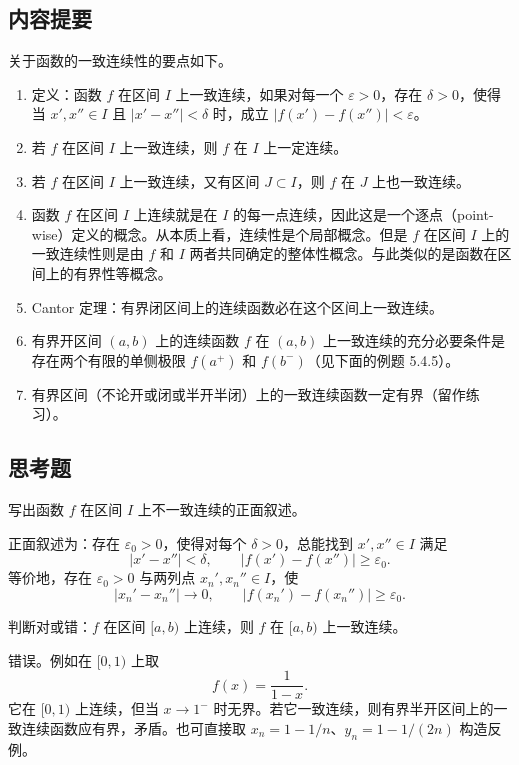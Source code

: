 \subsection{内容提要}

关于函数的一致连续性的要点如下。

\begin{enumerate}
  \item 定义：函数 $f$ 在区间 $I$ 上一致连续，如果对每一个 $\varepsilon>0$，存在 $\delta>0$，使得当 $x',x''\in I$ 且 $|x'-x''|<\delta$ 时，成立 $|f(x')-f(x'')|<\varepsilon$。
  \item 若 $f$ 在区间 $I$ 上一致连续，则 $f$ 在 $I$ 上一定连续。
  \item 若 $f$ 在区间 $I$ 上一致连续，又有区间 $J\subset I$，则 $f$ 在 $J$ 上也一致连续。
  \item 函数 $f$ 在区间 $I$ 上连续就是在 $I$ 的每一点连续，因此这是一个逐点（point-wise）定义的概念。从本质上看，连续性是个局部概念。但是 $f$ 在区间 $I$ 上的一致连续性则是由 $f$ 和 $I$ 两者共同确定的整体性概念。与此类似的是函数在区间上的有界性等概念。
  \item Cantor 定理：有界闭区间上的连续函数必在这个区间上一致连续。
  \item 有界开区间 $(a,b)$ 上的连续函数 $f$ 在 $(a,b)$ 上一致连续的充分必要条件是存在两个有限的单侧极限 $f(a^+)$ 和 $f(b^-)$（见下面的例题 5.4.5）。
  \item 有界区间（不论开或闭或半开半闭）上的一致连续函数一定有界（留作练习）。
\end{enumerate}

\subsection{思考题}

\begin{xthought}[1]
写出函数 $f$ 在区间 $I$ 上不一致连续的正面叙述。
\end{xthought}
\begin{xsolution}
正面叙述为：存在 $\varepsilon_0>0$，使得对每个 $\delta>0$，总能找到 $x',x''\in I$ 满足
\[
 |x'-x''|<\delta,
 \qquad
 |f(x')-f(x'')|\ge\varepsilon_0.
\]
等价地，存在 $\varepsilon_0>0$ 与两列点 $x_n',x_n''\in I$，使
\[
 |x_n'-x_n''|\to0,
 \qquad
 |f(x_n')-f(x_n'')|\ge\varepsilon_0.
\]
\end{xsolution}


\begin{xthought}[2]
判断对或错：$f$ 在区间 $[a,b)$ 上连续，则 $f$ 在 $[a,b)$ 上一致连续。
\end{xthought}
\begin{xsolution}
错误。例如在 $[0,1)$ 上取
\[
 f(x)=\frac1{1-x}.
\]
它在 $[0,1)$ 上连续，但当 $x\to1^-$ 时无界。若它一致连续，则有界半开区间上的一致连续函数应有界，矛盾。也可直接取 $x_n=1-1/n$、$y_n=1-1/(2n)$ 构造反例。
\end{xsolution}


